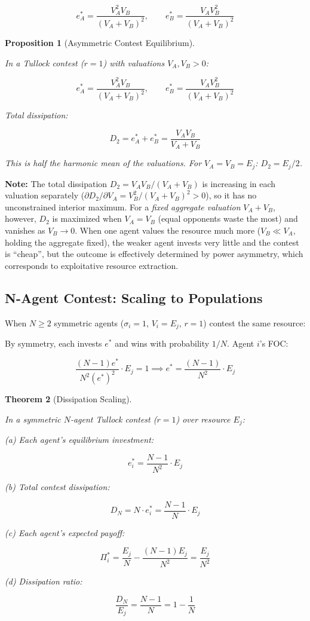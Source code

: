 \documentclass[11pt]{article}
\theoremstyle{plain}
\newtheorem{theorem}{Theorem}
\newtheorem{proposition}[theorem]{Proposition}
\theoremstyle{definition}
\theoremstyle{remark}
\let\origsubsection\subsection
\renewcommand{\subsection}{\needspace{7\baselineskip}\origsubsection}
\begin{document}
\[e_A^* = \frac{V_A^2 V_B}{(V_A + V_B)^2}, \qquad e_B^* = \frac{V_A V_B^2}{(V_A + V_B)^2}\]

\begin{proposition}[Asymmetric Contest Equilibrium]
\label{prop-asymmetric-contest}

In a Tullock contest ($r = 1$) with valuations $V_A, V_B > 0$:

$$e_A^* = \frac{V_A^2 V_B}{(V_A + V_B)^2}, \qquad e_B^* = \frac{V_A V_B^2}{(V_A + V_B)^2}$$

Total dissipation:

$$D_2 = e_A^* + e_B^* = \frac{V_A V_B}{V_A + V_B}$$

This is half the harmonic mean of the valuations. For $V_A = V_B = E_j$: $D_2 = E_j/2$.
\end{proposition}

\textbf{Note:} The total dissipation \(D_2 = V_A V_B / (V_A + V_B)\) is
increasing in each valuation separately
(\(\partial D_2/\partial V_A = V_B^2/(V_A+V_B)^2 > 0\)), so it has no
unconstrained interior maximum. For a \emph{fixed aggregate valuation}
\(V_A + V_B\), however, \(D_2\) is maximized when \(V_A = V_B\) (equal
opponents waste the most) and vanishes as \(V_B \to 0\). When one agent
values the resource much more (\(V_B \ll V_A\), holding the aggregate
fixed), the weaker agent invests very little and the contest is
``cheap'', but the outcome is effectively determined by power asymmetry,
which corresponds to exploitative resource extraction.

\subsection{N-Agent Contest: Scaling to
Populations}\label{n-agent-contest-scaling-to-populations}

When \(N \geq 2\) symmetric agents (\(\sigma_i = 1\), \(V_i = E_j\),
\(r = 1\)) contest the same resource:

By symmetry, each invests \(e^*\) and wins with probability \(1/N\).
Agent \(i\)'s FOC:

\[\frac{(N-1) e^*}{N^2 (e^*)^2} \cdot E_j = 1 \implies e^* = \frac{(N-1)}{N^2} \cdot E_j\]

\begin{theorem}[Dissipation Scaling]
\label{thm-dissipation-scaling}

In a symmetric $N$-agent Tullock contest ($r = 1$) over resource $E_j$:

(a) Each agent's equilibrium investment:

$$e_i^* = \frac{N - 1}{N^2} \cdot E_j$$

(b) Total contest dissipation:

$$D_N = N \cdot e_i^* = \frac{N - 1}{N} \cdot E_j$$

(c) Each agent's expected payoff:

$$\Pi_i^* = \frac{E_j}{N} - \frac{(N-1) E_j}{N^2} = \frac{E_j}{N^2}$$

(d) Dissipation ratio:

$$\frac{D_N}{E_j} = \frac{N - 1}{N} = 1 - \frac{1}{N}$$
\end{theorem}
\end{document}
